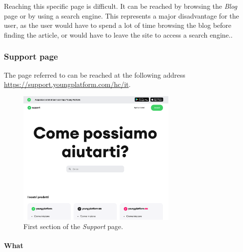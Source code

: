 Reaching this specific page is difficult. It can be reached by browsing the 
\textit{Blog} page or by using a search engine. This represents a major 
disadvantage for the user, as the user would have to spend a lot of time 
browsing the blog before finding the article, or would have to leave the 
site to access a search engine..

\subsubsection{Support page}

The page referred to can be reached at the following address \\
\href{https://support.youngplatform.com/hc/it}{https://support.youngplatform.com/hc/it}.

\begin{figure}[H]
  \centering
  \includegraphics[width=0.70\textwidth]{res/images/internal-pages/support/support-1.png}
  \caption{First section of the \textit{Support} page.}
  \label{fig:support-1}
\end{figure}

\paragraph{What}

